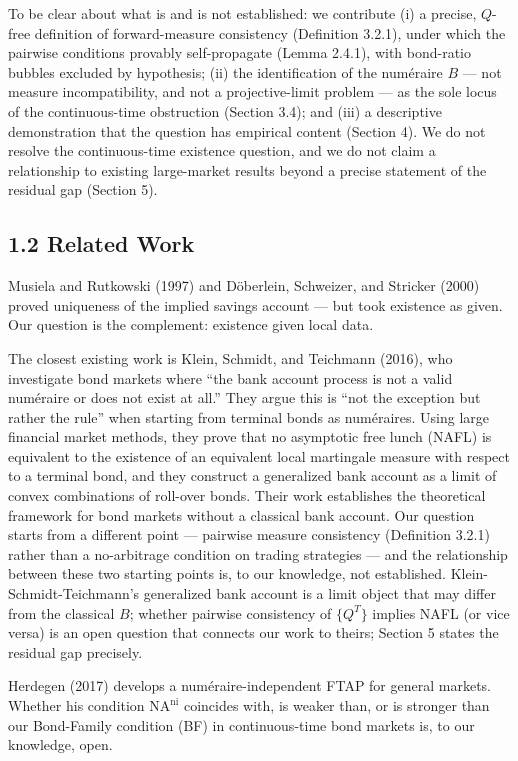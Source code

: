 \documentclass[
]{article}
\begin{document}
To be clear about what is and is not established: we contribute (i) a
precise, \(Q\)-free definition of forward-measure consistency
(Definition 3.2.1), under which the pairwise conditions provably
self-propagate (Lemma 2.4.1), with bond-ratio bubbles excluded by
hypothesis; (ii) the identification of the numéraire \(B\) --- not
measure incompatibility, and not a projective-limit problem --- as the
sole locus of the continuous-time obstruction (Section 3.4); and (iii) a
descriptive demonstration that the question has empirical content
(Section 4). We do not resolve the continuous-time existence question,
and we do not claim a relationship to existing large-market results
beyond a precise statement of the residual gap (Section 5).

\subsection{1.2 Related Work}\label{related-work}

Musiela and Rutkowski (1997) and Döberlein, Schweizer, and Stricker
(2000) proved uniqueness of the implied savings account --- but took
existence as given. Our question is the complement: existence given
local data.

The closest existing work is Klein, Schmidt, and Teichmann (2016), who
investigate bond markets where ``the bank account process is not a valid
numéraire or does not exist at all.'' They argue this is ``not the
exception but rather the rule'' when starting from terminal bonds as
numéraires. Using large financial market methods, they prove that no
asymptotic free lunch (NAFL) is equivalent to the existence of an
equivalent local martingale measure with respect to a terminal bond, and
they construct a generalized bank account as a limit of convex
combinations of roll-over bonds. Their work establishes the theoretical
framework for bond markets without a classical bank account. Our
question starts from a different point --- pairwise measure consistency
(Definition 3.2.1) rather than a no-arbitrage condition on trading
strategies --- and the relationship between these two starting points
is, to our knowledge, not established. Klein-Schmidt-Teichmann's
generalized bank account is a limit object that may differ from the
classical \(B\); whether pairwise consistency of \(\{Q^T\}\) implies
NAFL (or vice versa) is an open question that connects our work to
theirs; Section 5 states the residual gap precisely.

Herdegen (2017) develops a numéraire-independent FTAP for general
markets. Whether his condition \(\text{NA}^{\text{ni}}\) coincides with,
is weaker than, or is stronger than our Bond-Family condition (BF) in
continuous-time bond markets is, to our knowledge, open.
\end{document}
